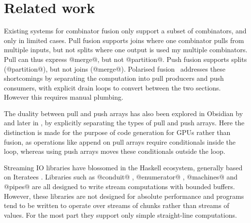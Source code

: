 \section{Related work}

Existing systems for combinator fusion only support a subset of combinators, and only in limited cases.
Pull fusion supports joins where one combinator pulls from multiple inputs, but not splits where one output is used my multiple combinators.
Pull can thus express @merge@, but not @partition@.
Push fusion supports splits (@partition@), but not joins (@merge@).
Polarised fusion~\cite{lippmeier2016polarized} addresses these shortcomings by separating the computation into pull producers and push consumers, with explicit drain loops to convert between the two sections. However this requires manual plumbing.

The duality between pull and push arrays has also been explored in Obsidian by \citep{claessen2012expressive} and later in \citep{svensson2014defunctionalizing}, by explicitly separating the types of pull and push arrays.
Here the distinction is made for the purpose of code generation for GPUs rather than fusion, as operations like append on pull arrays require conditionals inside the loop, whereas using push arrays moves these conditionals outside the loop.

Streaming IO libraries have blossomed in the Haskell ecosystem, generally based on Iteratees \cite{kiselyov2012iteratees}.
Libraries such as @conduit@ \cite{hackage:conduit}, @enumerator@ \cite{hackage:enumerator}, @machines@ \cite{hackage:machines} and @pipes@ \cite{hackage:pipes} are all designed to write stream computations with bounded buffers.
However, these libraries are not designed for absolute performance and programs tend to be written to operate over streams of chunks rather than streams of values.
For the most part they support only simple straight-line computations.

